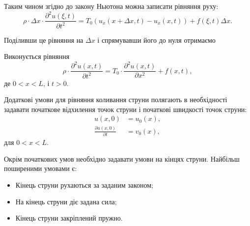 Таким чином згідно до закону Ньютона можна записати рівняння руху:
\begin{equation}
	\rho \cdot \Delta x \cdot \frac{\partial^2 u(\xi, t)}{\partial t^2} = T_0(u_x(x + \Delta x, t) - u_x(x, t)) + f(\xi, t) \Delta x.
\end{equation}

Поділивши це рівняння на $\Delta x$ і спрямувавши його до нуля отримаємо 

\begin{th_equation}
	Виконується рівняння
	\begin{equation}
		\rho \cdot \frac{\partial^2 u(x, t)}{\partial t^2} = T_0 \cdot \frac{\partial^2 u(x, t)}{\partial x^2} + f(x, t),
	\end{equation}
	де $0 < x < L$, і $t > 0$.
\end{th_equation}

Додаткові умови для рівняння коливання струни полягають в необхідності задавати початкове відхилення точок струни і початкові швидкості точок струни:
\begin{align}
	u(x, 0) &= u_0(x), \\
	\frac{\partial u(x, 0)}{\partial t} &= v_0(x),
\end{align}
для $0 < x < L$. \medskip

Окрім початкових умов необхідно задавати умови на кінцях струни. Найбільш поширеними умовами є:
\begin{itemize}
	\item Кінець струни рухаються за заданим законом;
	\item На кінець струни діє задана сила;
	\item Кінець струни закріплений пружно.
\end{itemize}

